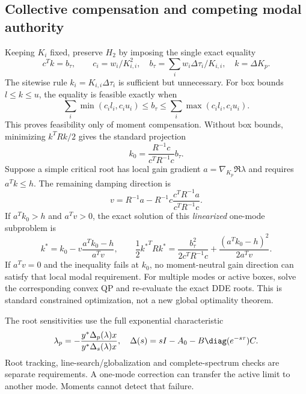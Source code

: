 \subsection{Collective compensation and competing modal authority}
Keeping $K_i$ fixed, preserve $H_2$ by imposing the single exact equality
\begin{equation}
 c^Tk=b_\tau,\qquad
 c_i=w_i/K_{i,i}^2,\quad
 b_\tau=\sum_iw_i\Delta\tau_i/K_{i,i},\quad k=\Delta K_p.
 \label{eq:collectivemoment}
\end{equation}
The sitewise rule $k_i=K_{i,i}\Delta\tau_i$ is sufficient but unnecessary.
For box bounds $l\le k\le u$, the equality is feasible exactly when
\[
 \sum_i\min(c_il_i,c_iu_i)\le b_\tau\le
 \sum_i\max(c_il_i,c_iu_i).
\]
This proves feasibility only of moment compensation. Without box bounds,
minimizing $k^TRk/2$ gives the standard projection
\[
 k_0=\frac{R^{-1}c}{c^TR^{-1}c}b_\tau.
\]
Suppose a simple critical root has local gain gradient $a=\nabla_{K_p}\Re\lambda$
and requires $a^Tk\le h$. The remaining damping direction is
\[
 v=R^{-1}a-R^{-1}c\frac{c^TR^{-1}a}{c^TR^{-1}c}.
\]
If $a^Tk_0>h$ and $a^Tv>0$, the exact solution of this \emph{linearized}
one-mode subproblem is
\begin{equation}
 k^*=k_0-v\frac{a^Tk_0-h}{a^Tv},\qquad
 \frac12{k^*}^TRk^*
 =\frac{b_\tau^2}{2c^TR^{-1}c}
  +\frac{(a^Tk_0-h)^2}{2a^Tv}.
 \label{eq:projectedauthority}
\end{equation}
If $a^Tv=0$ and the inequality fails at $k_0$, no moment-neutral gain direction
can satisfy that local modal requirement. For multiple modes or active boxes,
solve the corresponding convex QP and re-evaluate the exact DDE roots.
This is standard constrained optimization, not a new global optimality theorem.

The root sensitivities use the full exponential characteristic
\[
 \lambda_p=-\frac{y^*\Delta_p(\lambda)x}
                  {y^*\Delta_s(\lambda)x},\quad
 \Delta(s)=sI-A_0-B\diag(e^{-s\tau})C.
\]
Root tracking, line-search/globalization and complete-spectrum checks are
separate requirements. A one-mode correction can transfer the active limit to
another mode. Moments cannot detect that failure.

